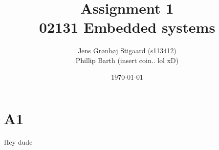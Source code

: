 \documentclass[12pt, danish, a4paper, titlepage]{article}
\title{{\huge Assignment 1}\\02131 Embedded systems}
\author{
		Jens Grønhøj Stigaard 	(s113412)\\
		Phillip Barth 		(insert coin.. lol xD)
}
\date{\small \today}
\begin{document}
	\maketitle	

	\section{A1}
		Hey dude
	
\end{document}
